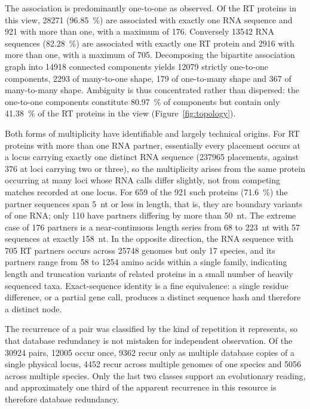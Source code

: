 The association is predominantly one-to-one as observed. Of the RT proteins in this view,
\num{28271} (\SI{96.85}{\percent}) are associated with exactly one RNA sequence and 921 with more
than one, with a maximum of 176. Conversely \num{13542} RNA sequences (\SI{82.28}{\percent}) are
associated with exactly one RT protein and \num{2916} with more than one, with a maximum of 705.
Decomposing the bipartite association graph into \num{14918} connected components yields \num{12079}
strictly one-to-one components, \num{2293} of many-to-one shape, 179 of one-to-many shape and 367 of
many-to-many shape. Ambiguity is thus concentrated rather than dispersed: the one-to-one components
constitute \SI{80.97}{\percent} of components but contain only \SI{41.38}{\percent} of the RT
proteins in the view (Figure~\ref{fig:topology}).

Both forms of multiplicity have identifiable and largely technical origins. For RT proteins with
more than one RNA partner, essentially every placement occurs at a locus carrying exactly one
distinct RNA sequence (\num{237965} placements, against 376 at loci carrying two or three), so the
multiplicity arises from the same protein occurring at many loci whose RNA calls differ slightly,
not from competing matches recorded at one locus. For 659 of the 921 such proteins
(\SI{71.6}{\percent}) the partner sequences span 5~nt or less in length, that is, they are boundary
variants of one RNA; only 110 have partners differing by more than 50~nt. The extreme case of 176
partners is a near-continuous length series from 68 to 223~nt with 57 sequences at exactly 158~nt.
In the opposite direction, the RNA sequence with 705 RT partners occurs across \num{25748} genomes
but only 17 species, and its partners range from 58 to \num{1254} amino acids within a single
family, indicating length and truncation variants of related proteins in a small number of heavily
sequenced taxa. Exact-sequence identity is a fine equivalence: a single residue difference, or a
partial gene call, produces a distinct sequence hash and therefore a distinct node.

The recurrence of a pair was classified by the kind of repetition it represents, so that database
redundancy is not mistaken for independent observation. Of the \num{30924} pairs, \num{12005} occur
once, \num{9362} recur only as multiple database copies of a single physical locus, \num{4452} recur
across multiple genomes of one species and \num{5056} across multiple species. Only the last two
classes support an evolutionary reading, and approximately one third of the apparent recurrence in
this resource is therefore database redundancy.


